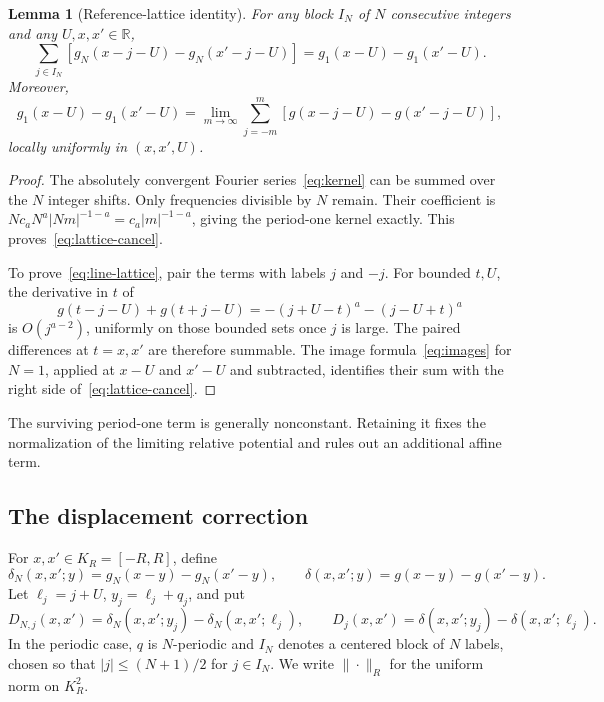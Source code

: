 \documentclass[11pt]{article}
\newtheorem{lemma}[theorem]{Lemma}
\theoremstyle{remark}\newtheorem{remark}[theorem]{Remark}
\newcommand{\R}{\mathbb R}
\begin{document}
\begin{lemma}[Reference-lattice identity]\label{lem:lattice}
For any block $I_N$ of $N$ consecutive integers and any $U,x,x'\in\R$,
\begin{equation}\label{eq:lattice-cancel}
 \sum_{j\in I_N}
 [g_N(x-j-U)-g_N(x'-j-U)]
            =g_1(x-U)-g_1(x'-U).
\end{equation}
Moreover,
\begin{equation}\label{eq:line-lattice}
 g_1(x-U)-g_1(x'-U)
  =\lim_{m\to\infty}\sum_{j=-m}^m
       [g(x-j-U)-g(x'-j-U)],
\end{equation}
locally uniformly in $(x,x',U)$.
\end{lemma}
\begin{proof}
The absolutely convergent Fourier series~\eqref{eq:kernel} can be
summed over the $N$ integer shifts. Only frequencies divisible by
$N$ remain. Their coefficient is
$Nc_aN^a|Nm|^{-1-a}=c_a|m|^{-1-a}$, giving the period-one
kernel exactly. This proves~\eqref{eq:lattice-cancel}.

To prove~\eqref{eq:line-lattice}, pair the terms with labels $j$
and $-j$. For bounded $t,U$, the derivative in $t$ of
\[
 g(t-j-U)+g(t+j-U)
       =-(j+U-t)^a-(j-U+t)^a
\]
is $O(j^{a-2})$, uniformly on those bounded sets once $j$ is large.
The paired differences at $t=x,x'$ are therefore summable. The
image formula~\eqref{eq:images} for $N=1$, applied at $x-U$ and
$x'-U$ and subtracted, identifies their sum with the right side
of~\eqref{eq:lattice-cancel}.
\end{proof}

The surviving period-one term is generally nonconstant. Retaining
it fixes the normalization of the limiting relative potential and
rules out an additional affine term.

\subsection{The displacement correction}

For $x,x'\in K_R=[-R,R]$, define
\[
 \delta_N(x,x';y)=g_N(x-y)-g_N(x'-y),\qquad
 \delta(x,x';y)=g(x-y)-g(x'-y).
\]
Let $\ell_j=j+U$, $y_j=\ell_j+q_j$, and put
\[
 D_{N,j}(x,x')=\delta_N(x,x';y_j)-\delta_N(x,x';\ell_j),
 \qquad
 D_j(x,x')=\delta(x,x';y_j)-\delta(x,x';\ell_j).
\]
In the periodic case, $q$ is $N$-periodic and $I_N$ denotes a
centered block of $N$ labels, chosen so that
$|j|\le(N+1)/2$ for $j\in I_N$. We write $\|\cdot\|_R$ for
the uniform norm on $K_R^2$.
\end{document}
